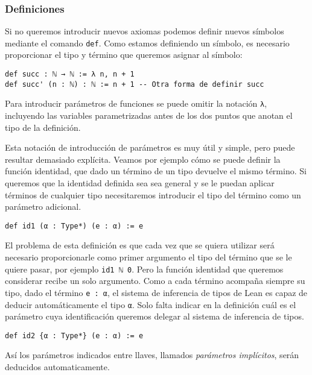 \subsubsection{Definiciones}%
Si no queremos introducir nuevos axiomas podemos definir nuevos símbolos
mediante el comando \lstinline{def}. Como estamos definiendo un símbolo, es
necesario proporcionar el tipo y término que queremos asignar al símbolo:
\begin{lstlisting}
def succ : ℕ → ℕ := λ n, n + 1
def succ' (n : ℕ) : ℕ := n + 1 -- Otra forma de definir succ
\end{lstlisting}

Para introducir parámetros de funciones se puede omitir la notación
\lstinline{λ}, incluyendo las variables parametrizadas antes de los dos puntos
que anotan el tipo de la definición.

Esta notación de introducción de parámetros es muy útil y simple, pero puede
resultar demasiado explícita. Veamos por ejemplo cómo se puede definir la
función identidad, que dado un término de un tipo devuelve el mismo término.
Si queremos que la identidad definida sea sea general y se le puedan aplicar términos
de cualquier tipo necesitaremos introducir el tipo del término como un parámetro
adicional.

\begin{lstlisting}
def id1 (α : Type*) (e : α) := e
\end{lstlisting}

El problema de esta definición es que cada vez que se quiera utilizar será
necesario proporcionarle como primer argumento el tipo del término que se le
quiere pasar, por ejemplo \lstinline{id1 ℕ 0}.
Pero la función identidad que queremos considerar recibe un solo argumento.
Como a cada término acompaña siempre su tipo, dado el término \lstinline{e : α},
el sistema de inferencia de tipos de Lean es capaz de deducir automáticamente el
tipo \lstinline{α}. Solo falta indicar en la definición cuál es el parámetro
cuya identificación queremos delegar al sistema de inferencia de tipos.

\begin{lstlisting}
def id2 {α : Type*} (e : α) := e
\end{lstlisting}

Así los parámetros indicados entre llaves, llamados \textit{parámetros implícitos}, serán deducidos automaticamente.

\newpage

